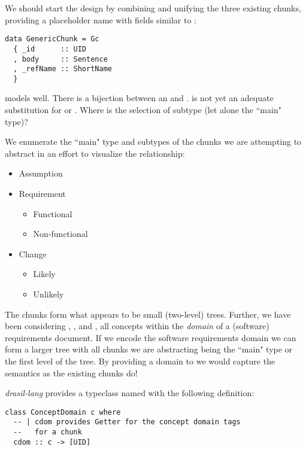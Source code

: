 We should start the design by combining and unifying the three existing chunks, providing a placeholder name  with fields similar to :

\begin{tcolorbox}
\begin{verbatim}
data GenericChunk = Gc
  { _id      :: UID
  , body     :: Sentence
  , _refName :: ShortName
  }
\end{verbatim}
\end{tcolorbox}

 models  well. There is a bijection between an  and .  is not yet an adequate substitution for  or . Where is the selection of subtype (let alone the ``main" type)?

We enumerate the ``main" type and subtypes of the chunks we are attempting to abstract in an effort to visualize the relationship:

\begin{itemize}
	\item Assumption
	\item Requirement
	\begin{itemize}
		\item Functional
		\item Non-functional
	\end{itemize}
	\item Change
	\begin{itemize}
		\item Likely
		\item Unlikely
	\end{itemize}
\end{itemize}

The chunks form what appears to be small (two-level) trees. Further, we have been considering , , and , all concepts within the \textit{domain} of a (software) requirements document. If we encode the software requirements domain we can form a larger tree with all chunks we are abstracting being the ``main" type or the first level of the tree. By providing a domain to  we would capture the semantics as the existing chunks do!

\textit{drasil-lang} provides a typeclass named  with the following definition:

\begin{tcolorbox}
\begin{verbatim}
class ConceptDomain c where
  -- | cdom provides Getter for the concept domain tags
  --   for a chunk
  cdom :: c -> [UID]
\end{verbatim}
\end{tcolorbox}

